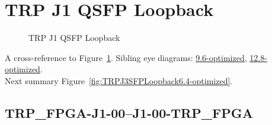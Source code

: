 

% 

\section{TRP J1 QSFP Loopback}\label{sec:TRPJ1QSFPLoopback6.4-optimized}

\begin{figure}[h] %
\begin{subfigure}{0.5\textwidth}
\hyperref[sec:TRPFPGAJ100J100TRPFPGA6.4-optimized]{}
\end{subfigure}\hspace*{\fill}
\begin{subfigure}{0.5\textwidth}
\hyperref[sec:TRPFPGAJ101J101TRPFPGA6.4-optimized]{}
\end{subfigure}

\begin{subfigure}{0.5\textwidth}
\hyperref[sec:TRPFPGAJ102J102TRPFPGA6.4-optimized]{}
\end{subfigure}\hspace*{\fill}
\begin{subfigure}{0.5\textwidth}
\hyperref[sec:TRPFPGAJ103J103TRPFPGA6.4-optimized]{}
\end{subfigure}

\caption{TRP J1 QSFP Loopback} \label{fig:TRPJ1QSFPLoopback6.4-optimized}
\end{figure}

A cross-reference to Figure~\ref{fig:TRPJ1QSFPLoopback6.4-optimized}.
Sibling eye diagrams: \hyperref[sec:TRPJ1QSFPLoopback9.6-optimized]{9.6-optimized}, \hyperref[sec:TRPJ1QSFPLoopback12.8-optimized]{12.8-optimized}. \\
Next summary Figure~\ref{fig:TRPJ3SFPLoopback6.4-optimized}.
\clearpage
% 
\subsection{TRP\_FPGA-J1-00--J1-00-TRP\_FPGA}\label{sec:TRPFPGAJ100J100TRPFPGA6.4-optimized}

